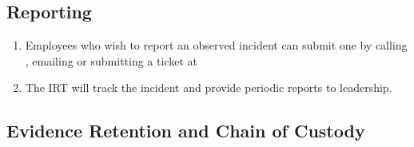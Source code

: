 \documentclass[../main.tex]{subfiles}
\begin{document}
\subsection{Reporting}
    \begin{enumerate}
        \item Employees who wish to report an observed incident can submit one by calling \ReportingNumber{},
        emailing \ReportingEmail{} or submitting a ticket at \TicketPortal{}
        \item The IRT will track the incident and provide periodic reports to \CompanyName{} leadership.
    \end{enumerate}
\subsection{Evidence Retention and Chain of Custody}
\end{document}
